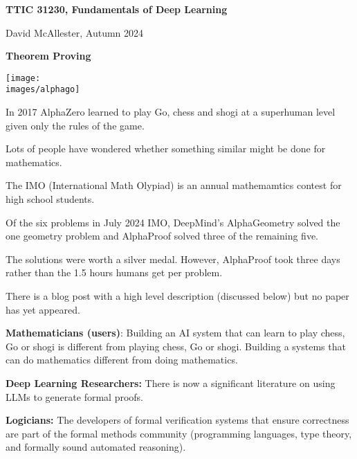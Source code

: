 




{\Huge

  \centerline{\bf TTIC 31230, Fundamentals of Deep Learning}

  
\bigskip

\centerline{David McAllester, Autumn  2024}


\vfill

\centerline{\bf Theorem Proving}

\vfill
\vfill



\centerline{\texttt{[image: \\images/alphago]}}

\vfill

In 2017 AlphaZero learned to play Go, chess and shogi at a superhuman level given only the rules of the game.

\vfill
Lots of people have wondered whether something similar might be done for mathematics.


The IMO (International Math Olypiad) is an annual mathemamtics contest for high school students.

\vfill
Of the six problems in July 2024 IMO, DeepMind's AlphaGeometry solved the one geometry problem and AlphaProof solved three of the remaining five.

\vfill
The solutions were worth a silver medal.  However, AlphaProof took three days rather than the 1.5 hours humans get per problem.

\vfill
There is a blog post with a high level description (discussed below) but no paper has yet appeared.


{\bf Mathematicians (users)}: Building an AI system that can learn to play chess, Go or shogi is different from playing
chess, Go or shogi. Building a systems that can do mathematics different from doing mathematics.


\vfill
{\bf Deep Learning Researchers:} There is now a significant literature on using LLMs to generate formal proofs.

\vfill
{\bf Logicians:} The developers of formal verification systems that ensure correctness
are part of the formal methods community (programming languages, type theory, and formally sound automated reasoning).

}
